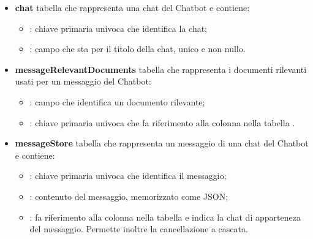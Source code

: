 \documentclass[10pt, a4paper]{article}
\begin{document}
\begin{itemize}

    \item \textbf{chat} tabella che rappresenta una chat del Chatbot e contiene:
    \begin{itemize}
        \item {}: chiave primaria univoca che identifica la chat;
        \item {}: campo che sta per il titolo della chat, unico e non nullo.\\
    \end{itemize}
        
    \item \textbf{messageRelevantDocuments} tabella che rappresenta i documenti rilevanti usati per un messaggio del Chatbot:
    \begin{itemize}
        \item {}: campo che identifica un documento rilevante; 
        \item {}: chiave primaria univoca che fa riferimento alla colonna  nella tabella .\\
    \end{itemize}
         
    \item \textbf{messageStore} tabella che rappresenta un messaggio di una chat del Chatbot e contiene:
    \begin{itemize}
        \item {}: chiave primaria univoca che identifica il messaggio;
        \item {}: contenuto del messaggio, memorizzato come JSON;
        \item {}: fa riferimento alla colonna  nella tabella  e indica la chat di apparteneza del messaggio. Permette inoltre la cancellazione a cascata.\\
    \end{itemize}
    
\end{itemize}




\newpage
\end{document}
